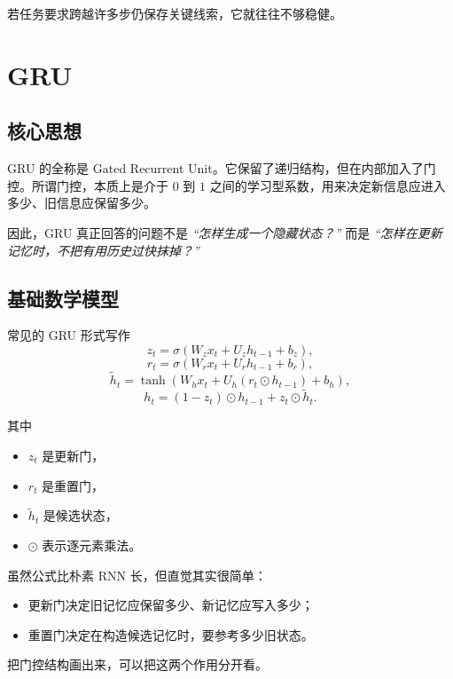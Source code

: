 \documentclass[12pt,a4paper]{ctexart}
\begin{document}
若任务要求跨越许多步仍保存关键线索，它就往往不够稳健。

\section{GRU}

\subsection{核心思想}

GRU 的全称是 Gated Recurrent Unit。它保留了递归结构，但在内部加入了门控。所谓门控，本质上是介于 \(0\) 到 \(1\) 之间的学习型系数，用来决定新信息应进入多少、旧信息应保留多少。

因此，GRU 真正回答的问题不是
\emph{“怎样生成一个隐藏状态？”}
而是
\emph{“怎样在更新记忆时，不把有用历史过快抹掉？”}

\subsection{基础数学模型}

常见的 GRU 形式写作
\[
z_t = \sigma(W_z x_t + U_z h_{t-1} + b_z),
\]
\[
r_t = \sigma(W_r x_t + U_r h_{t-1} + b_r),
\]
\[
\tilde{h}_t = \tanh(W_h x_t + U_h(r_t \odot h_{t-1}) + b_h),
\]
\[
h_t = (1-z_t)\odot h_{t-1} + z_t \odot \tilde{h}_t.
\]

其中
\begin{itemize}
  \item \(z_t\) 是更新门，
  \item \(r_t\) 是重置门，
  \item \(\tilde{h}_t\) 是候选状态，
  \item \(\odot\) 表示逐元素乘法。
\end{itemize}

虽然公式比朴素 RNN 长，但直觉其实很简单：
\begin{itemize}
  \item 更新门决定旧记忆应保留多少、新记忆应写入多少；
  \item 重置门决定在构造候选记忆时，要参考多少旧状态。
\end{itemize}

把门控结构画出来，可以把这两个作用分开看。
\end{document}
